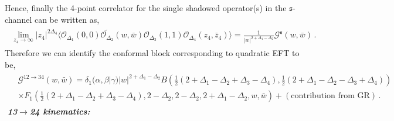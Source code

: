 Hence, finally the 4-point correlator for the single shadowed operator(s) in the $\mathfrak{s}$-channel can be written as,
\begin{align}
    \begin{split}
      \lim_{z_4\to \infty}  |z_4|^{2\Delta_4}\Big\langle\mathcal{O}_{\Delta_1}(0,0)\widetilde{\mathcal{O}_{\Delta_2}}(w,\bar w)\mathcal{O}_{\Delta_3}(1,1)\mathcal{O}_{\Delta_4}(z_4,\bar z_4)\Big\rangle=\frac{1}{|w|^{2+\Delta_1-\Delta_2}}\mathcal{G}^{\mathfrak{s}}
      (w,\bar w)\,.
    \end{split}
\end{align}
Therefore we can identify the conformal block corresponding to quadratic EFT to be,
\begin{align}
    \begin{split} \label{s-channel}
    &\mathcal{G}^{12\to34}
      (w,\bar w)=\delta_1(\alpha,\beta|\gamma)|w|^{2+\Delta_1-\Delta_2}B\left(\frac{1}{2}(2+\Delta_1-\Delta_2+\Delta_3-\Delta_4),\frac{1}{2}(2+\Delta_1-\Delta_2-\Delta_3+\Delta_4)\right)\\ &\times F_{1}\left(\frac{1}{2}(2+\Delta_1-\Delta_2+\Delta_3-\Delta_4),2-\Delta_2,2-\Delta_2,2+\Delta_1-\Delta_2,w,\bar w\right)+(\textrm{contribution from GR})\,.
    \end{split}
\end{align}
{\,\,{\textbf{\textit{13$\to$24 kinematics:}}}}

